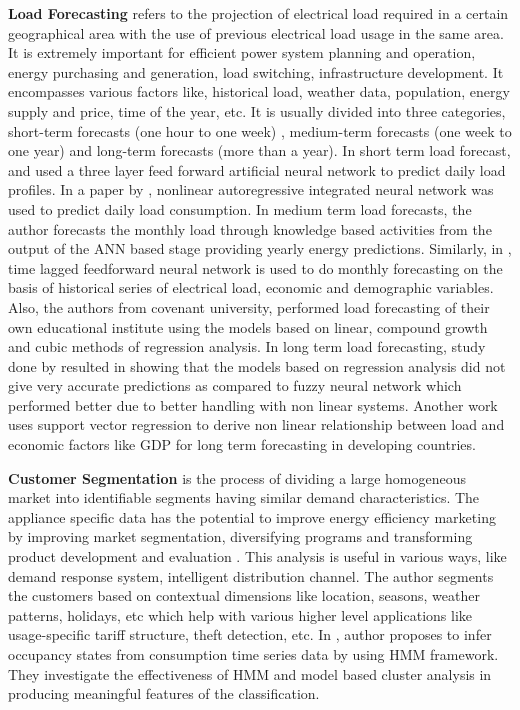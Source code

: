 \documentclass[runningheads,a4paper]{llncs}
\begin{document}
\noindent \textbf{Load Forecasting} refers to the projection of electrical load required in a certain geographical area with the use of previous electrical load usage in the same area. It is extremely important for efficient power system planning and operation, energy purchasing and generation, load switching, infrastructure development. It encompasses various factors like, historical load, weather data, population, energy supply and price, time of the year, etc.
It is usually divided into three categories, short-term forecasts (one hour to one week) , medium-term forecasts (one week to one year) and long-term forecasts (more than a year).
In short term load forecast, \cite{Bakirtzis} and \cite{Chen} used a three layer feed forward artificial neural network to predict daily load profiles. In a paper by \cite{Chow}, nonlinear autoregressive integrated neural network was used to predict daily load consumption.
In medium term load forecasts, the author forecasts \cite{Falvo} the monthly load through knowledge based activities from the output of the ANN based stage providing yearly energy predictions. Similarly, in \cite{bassi}, time lagged feedforward neural network is used to do monthly forecasting on the basis of historical series of electrical load, economic and demographic variables. Also, the authors from covenant university, \cite{samuel} performed load forecasting of their own educational institute using the models based on linear, compound growth and cubic methods of regression analysis.
In long term load forecasting, study done by \cite{Daneshi} resulted in showing that the models based on regression analysis did not give very accurate predictions as compared to fuzzy neural network which performed better due to better handling with non linear systems. Another work  \cite{Zhang} uses support vector regression to derive non linear relationship between load and economic factors like GDP for long term forecasting in developing countries.



\noindent \textbf{Customer Segmentation} is the process of dividing a large homogeneous market into identifiable segments having similar demand characteristics. The appliance specific data has the potential to improve energy efficiency marketing by improving market segmentation, diversifying programs and transforming product development and evaluation \cite{CarrieArmel2013213}. This analysis is useful in various ways, like demand response system, intelligent distribution channel. The author \cite{wijaya2014consumer} segments the customers based on contextual dimensions like location, seasons, weather patterns, holidays, etc which help with various higher level applications like usage-specific tariff structure, theft detection, etc. In \cite{Albert}, author proposes to infer occupancy states from consumption time series data by using HMM framework. They investigate the effectiveness of HMM and model based cluster analysis in producing meaningful features of the classification. 
\end{document}
